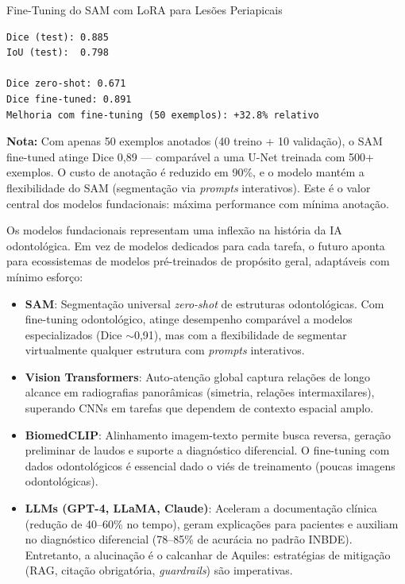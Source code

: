 \begin{pratica}{Fine-Tuning do SAM com LoRA para Lesões Periapicais}
\begin{lstlisting}[style=saida]
Dice (test): 0.885
IoU (test):  0.798

Dice zero-shot: 0.671
Dice fine-tuned: 0.891
Melhoria com fine-tuning (50 exemplos): +32.8% relativo
\end{lstlisting}

\textbf{Nota:} Com apenas 50 exemplos anotados (40 treino + 10 validação), o SAM fine-tuned atinge Dice 0,89 --- comparável a uma U-Net treinada com 500+ exemplos. O custo de anotação é reduzido em 90\%, e o modelo mantém a flexibilidade do SAM (segmentação via \textit{prompts} interativos). Este é o valor central dos modelos fundacionais: máxima performance com mínima anotação.
\end{pratica}


Os modelos fundacionais representam uma inflexão na história da IA odontológica. Em vez de modelos dedicados para cada tarefa, o futuro aponta para ecossistemas de modelos pré-treinados de propósito geral, adaptáveis com mínimo esforço:

\begin{itemize}
    \item \textbf{SAM}: Segmentação universal \textit{zero-shot} de estruturas odontológicas. Com fine-tuning odontológico, atinge desempenho comparável a modelos especializados (Dice $\sim$0,91), mas com a flexibilidade de segmentar virtualmente qualquer estrutura com \textit{prompts} interativos.

    \item \textbf{Vision Transformers}: Auto-atenção global captura relações de longo alcance em radiografias panorâmicas (simetria, relações intermaxilares), superando CNNs em tarefas que dependem de contexto espacial amplo.

    \item \textbf{BiomedCLIP}: Alinhamento imagem-texto permite busca reversa, geração preliminar de laudos e suporte a diagnóstico diferencial. O fine-tuning com dados odontológicos é essencial dado o viés de treinamento (poucas imagens odontológicas).

    \item \textbf{LLMs (GPT-4, LLaMA, Claude)}: Aceleram a documentação clínica (redução de 40--60\% no tempo), geram explicações para pacientes e auxiliam no diagnóstico diferencial (78--85\% de acurácia no padrão INBDE). Entretanto, a alucinação é o calcanhar de Aquiles: estratégias de mitigação (RAG, citação obrigatória, \textit{guardrails}) são imperativas.
\end{itemize}

